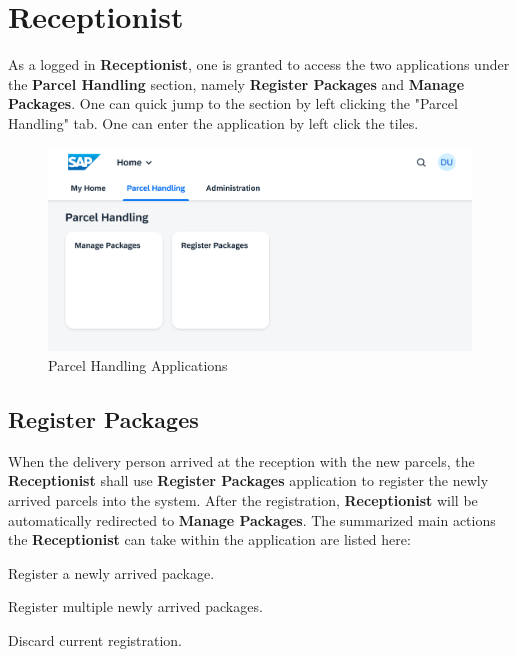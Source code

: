 \pagebreak

\section{Receptionist}

As a logged in \textbf{Receptionist}, one is granted to access the two applications under the \textbf{Parcel Handling} section, namely \textbf{Register Packages} and \textbf{Manage Packages}. One can quick jump to the section by left clicking the "Parcel Handling" tab. One can enter the application by left click the tiles.

\begin{figure}[H]
	\centering
	\includegraphics[width=1\linewidth]{images/user_doc/overviews/ParcelHandlingTab.png}
	\caption{Parcel Handling Applications}
	\label{fig:PHApplications}
\end{figure}


\subsection{Register Packages}
\label{subsec:rp}

When the delivery person arrived at the reception with the new parcels, the \textbf{Receptionist} shall use \textbf{Register Packages} application to register the newly arrived parcels into the system. After the registration, \textbf{Receptionist} will be automatically redirected to  \textbf{Manage Packages}.
The summarized main actions the \textbf{Receptionist} can take within the application are listed here:

\begin{compactenum}
	\item Register a newly arrived package.
    \item Register multiple newly arrived packages.
    \item Discard current registration.
\end{compactenum}

